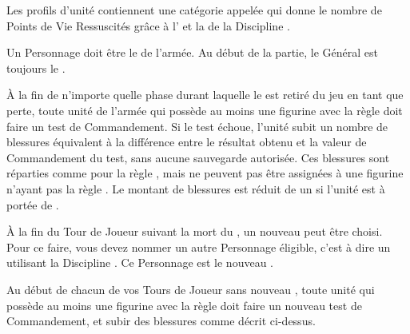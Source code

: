 
\newcommand{\QRSnote}{%
\noindent$^{1}$ En Monture, le Personnage remplace le \cadavermaster{}.

\noindent$^{2}$ En Monture, le Personnage remplace une \paramour{}.
}













\startarmywiderules

\armywideruleentry{\invocation}

Les profils d'unité contiennent une catégorie appelée \invocation{} qui donne le nombre de Points de Vie Ressuscités grâce à l'\necromancysignature{} et la \necromancyspellfour{} de la Discipline \necromancy{}.

\armywideruleentry{\masterofundeath}

Un Personnage doit être le \textbf{\master{}} de l'armée. Au début de la partie, le Général est toujours le \master{}.

\closearmywiderules

\vspace*{1.5cm}
\startarmyspecialrules

\armyspecialruleentry{\ashestoashes}

À la fin de n'importe quelle phase durant laquelle le \master{} est retiré du jeu en tant que perte, toute unité de l'armée qui possède au moins une figurine avec la règle \ashestoashes{} doit faire un test de Commandement. Si le test échoue, l'unité subit un nombre de blessures équivalent à la différence entre le résultat obtenu et la valeur de Commandement du test, sans aucune sauvegarde autorisée. Ces blessures sont réparties comme pour la règle \unstable{}, mais ne peuvent pas être assignées à une figurine n'ayant pas la règle \ashestoashes{}. Le montant de blessures est réduit de un si l'unité est à portée de \holdyourground{}.

\vspace*{5pt}À la fin du Tour de Joueur suivant la mort du \master{}, un nouveau \master{} peut être choisi. Pour ce faire, vous devez nommer un autre Personnage éligible, c'est à dire un \wizard{} utilisant la Discipline \necromancy{}. Ce Personnage est le nouveau \master{}.

\vspace*{5pt}Au début de chacun de vos Tours de Joueur sans nouveau \master{}, toute unité qui possède au moins une figurine avec la règle \ashestoashes{} doit faire un nouveau test de Commandement, et subir des blessures comme décrit ci-dessus.

